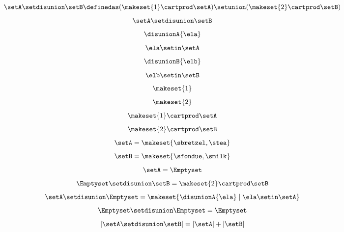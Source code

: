 \begin{forslides}
    \begin{equation}\label{eq:slides_session2_59}
        \setA \setdisunion \setB \definedas (  \makeset{ 1 } \cartprod \setA) \setunion ( \makeset{2}  \cartprod \setB)
    \end{equation}
    \begin{equation}\label{eq:slides_session2_60}
        \setA \setdisunion \setB
    \end{equation}
    \begin{equation}\label{eq:slides_session2_61}
        \disunionA{\ela}
    \end{equation}
    \begin{equation}\label{eq:slides_session2_62}
        \ela \setin\setA
    \end{equation}
    \begin{equation}\label{eq:slides_session2_63}
        \disunionB{\elb}
    \end{equation}
    \begin{equation}\label{eq:slides_session2_64}
        \elb \setin\setB
    \end{equation}
    \begin{equation}\label{eq:slides_session2_65}
        \makeset{ 1 }
    \end{equation}
    \begin{equation}\label{eq:slides_session2_66}
        \makeset{2}
    \end{equation}
    \begin{equation}\label{eq:slides_session2_67}
        \makeset{ 1 }  \cartprod \setA
    \end{equation}
    \begin{equation}\label{eq:slides_session2_68}
        \makeset{2}  \cartprod \setB
    \end{equation}
    \begin{equation}\label{eq:slides_session2_69}
        \setA=\makeset{\sbretzel, \stea}
    \end{equation}
    \begin{equation}\label{eq:slides_session2_70}
        \setB=\makeset{\sfondue, \smilk}
    \end{equation}
    \begin{equation}\label{eq:slides_session2_71}
        \setA = \Emptyset
    \end{equation}
    \begin{equation}\label{eq:slides_session2_72}
        \Emptyset \setdisunion \setB =  \makeset{2} \cartprod \setB
    \end{equation}
    \begin{equation}\label{eq:slides_session2_73}
        \setA \setdisunion \Emptyset =  \makeset{ \disunionA{\ela} \mid \ela \setin\setA }
    \end{equation}
    \begin{equation}\label{eq:slides_session2_74}
        \Emptyset \setdisunion \Emptyset = \Emptyset
    \end{equation}
    \begin{equation}\label{eq:slides_session2_75}
        \vert \setA \setdisunion \setB \vert = \vert \setA \vert + \vert \setB \vert
    \end{equation}

\end{forslides}

